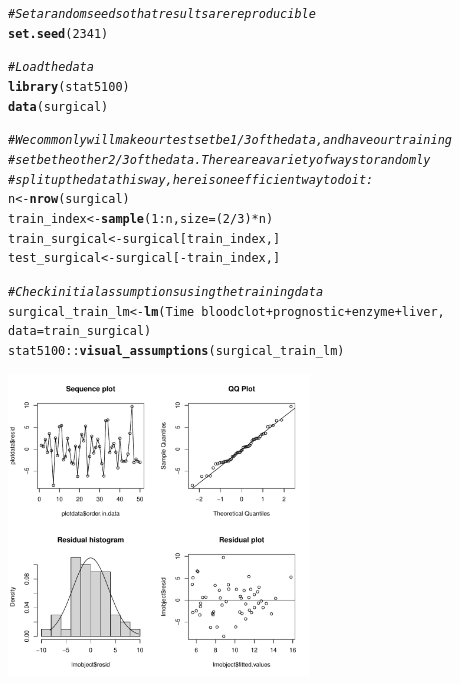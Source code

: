 \documentclass{article}\usepackage[]{graphicx}\usepackage[]{color}
\makeatletter
\newcommand{\hlnum}[1]{\textcolor[rgb]{0.686,0.059,0.569}{#1}}%
\newcommand{\hlcom}[1]{\textcolor[rgb]{0.678,0.584,0.686}{\textit{#1}}}%
\newcommand{\hlopt}[1]{\textcolor[rgb]{0,0,0}{#1}}%
\newcommand{\hlstd}[1]{\textcolor[rgb]{0.345,0.345,0.345}{#1}}%
\newcommand{\hlkwb}[1]{\textcolor[rgb]{0.69,0.353,0.396}{#1}}%
\newcommand{\hlkwc}[1]{\textcolor[rgb]{0.333,0.667,0.333}{#1}}%
\newcommand{\hlkwd}[1]{\textcolor[rgb]{0.737,0.353,0.396}{\textbf{#1}}}%
\newenvironment{kframe}{%
 \def\at@end@of@kframe{}%
 \ifinner\ifhmode%
  \def\at@end@of@kframe{\end{minipage}}%
  \begin{minipage}{\columnwidth}%
 \fi\fi%
 \def\FrameCommand##1{\hskip\@totalleftmargin \hskip-\fboxsep
 \colorbox{shadecolor}{##1}\hskip-\fboxsep
     \hskip-\linewidth \hskip-\@totalleftmargin \hskip\columnwidth}%
 \MakeFramed {\advance\hsize-\width
   \@totalleftmargin\z@ \linewidth\hsize
   \@setminipage}}%
 {\par\unskip\endMakeFramed%
 \at@end@of@kframe}
\newenvironment{knitrout}{}{} %
\makeatother
\begin{document}
\begin{knitrout}
\color{fgcolor}\begin{kframe}
\begin{alltt}
\hlcom{# Set a random seed so that results are reproducible}
\hlkwd{set.seed}\hlstd{(}\hlnum{2341}\hlstd{)}

\hlcom{# Load the data}
\hlkwd{library}\hlstd{(stat5100)}
\hlkwd{data}\hlstd{(surgical)}

\hlcom{# We commonly will make our test set be 1/3 of the data, and have our training}
\hlcom{# set be the other 2/3 of the data. There are a variety of ways to randomly}
\hlcom{# split up the data this way, here is one efficient way to do it:}
\hlstd{n} \hlkwb{<-} \hlkwd{nrow}\hlstd{(surgical)}
\hlstd{train_index} \hlkwb{<-} \hlkwd{sample}\hlstd{(}\hlnum{1}\hlopt{:}\hlstd{n,} \hlkwc{size} \hlstd{= (}\hlnum{2}\hlopt{/}\hlnum{3}\hlstd{)}\hlopt{*}\hlstd{n)}
\hlstd{train_surgical} \hlkwb{<-} \hlstd{surgical[train_index, ]}
\hlstd{test_surgical} \hlkwb{<-} \hlstd{surgical[}\hlopt{-}\hlstd{train_index, ]}

\hlcom{# Check initial assumptions using the training data}
\hlstd{surgical_train_lm} \hlkwb{<-} \hlkwd{lm}\hlstd{(Time} \hlopt{~} \hlstd{bloodclot} \hlopt{+} \hlstd{prognostic} \hlopt{+} \hlstd{enzyme} \hlopt{+} \hlstd{liver,}
                        \hlkwc{data} \hlstd{= train_surgical)}
\hlstd{stat5100}\hlopt{::}\hlkwd{visual_assumptions}\hlstd{(surgical_train_lm)}
\end{alltt}
\end{kframe}

{\centering \includegraphics[width=0.6\textwidth]{figure/unnamed-chunk-1-1} 

}



\end{knitrout}
\end{document}
